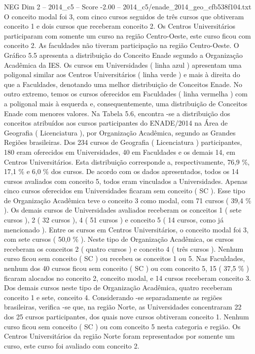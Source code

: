 \begin{textsample}{NEG Dim 2 – 2014\_c5 – Score -2.00 – 2014\_c5/enade\_2014\_geo\_cfb538f104.txt}
O conceito modal foi 3, com cinco cursos seguidos de três cursos que obtiveram conceito 1 e dois cursos que receberam conceito 2.
Os Centros Universitários participaram com somente um curso na região Centro-Oeste, este curso ficou com conceito 2.
As faculdades não tiveram participação na região Centro-Oeste.
O Gráfico 5.5 apresenta a distribuição do Conceito Enade segundo a Organização Acadêmica da IES.
Os cursos em Universidades ( linha azul ) apresentam uma poligonal similar aos Centros Universitários ( linha verde ) e mais à direita do que a Faculdades, denotando uma melhor distribuição de Conceitos Enade.
No outro extremo, temos os cursos oferecidos em Faculdades ( linha vermelha ) com a poligonal mais à esquerda e, consequentemente, uma distribuição de Conceitos Enade com menores valores.
Na Tabela 5.6, encontra -se a distribuição dos conceitos atribuídos aos cursos participantes do ENADE/2014 na Área de Geografia ( Licenciatura ), por Organização Acadêmica, segundo as Grandes Regiões brasileiras.
Dos 234 cursos de Geografia ( Licenciatura ) participantes, 180 eram oferecidos em Universidades, 40 em Faculdades e os demais 14, em Centros Universitários.
Esta distribuição corresponde a, respectivamente, 76,9 \%, 17,1 \% e 6,0 \% dos cursos.
De acordo com os dados apresentados, todos os 14 cursos avaliados com conceito 5, todos eram vinculados a Universidades.
Apenas cinco cursos oferecidos em Universidades ficaram sem conceito ( SC ).
Esse tipo de Organização Acadêmica teve o conceito 3 como modal, com 71 cursos ( 39,4 \% ).
Os demais cursos de Universidades avaliados receberam os conceitos 1 ( sete cursos ), 2 ( 32 cursos ), 4 ( 51 cursos ) e conceito 5 ( 14 cursos, como já mencionado ).
Entre os cursos em Centros Universitários, o conceito modal foi 3, com sete cursos ( 50,0 \% ).
Neste tipo de Organização Acadêmica, os cursos receberam os conceitos 2 ( quatro cursos ) e conceito 4 ( três cursos ).
Nenhum curso ficou sem conceito ( SC ) ou recebeu os conceitos 1 ou 5.
Nas Faculdades, nenhum dos 40 cursos ficou sem conceito ( SC ) ou com conceito 5, 15 ( 37,5 \% ) ficaram alocados no conceito 2, conceito modal, e 14 cursos receberam conceito 3.
Dos demais cursos neste tipo de Organização Acadêmica, quatro receberam conceito 1 e sete, conceito 4.
Considerando -se separadamente as regiões brasileiras, verifica -se que, na região Norte, as Universidades concentraram 22 dos 25 cursos participantes, dos quais nove cursos obtiveram conceito 1.
Nenhum curso ficou sem conceito ( SC ) ou com conceito 5 nesta categoria e região.
Os Centros Universitários da região Norte foram representados por somente um curso, este curso foi avaliado com conceito 2.

\end{textsample}
